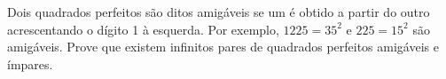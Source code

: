 Dois quadrados perfeitos são ditos amigáveis se um é obtido a partir do outro acrescentando
o dígito 1 à esquerda. Por exemplo, $1225 = 35^2$ e $225 = 15^2$ são amigáveis. Prove que existem
infinitos pares de quadrados perfeitos amigáveis e ímpares.
